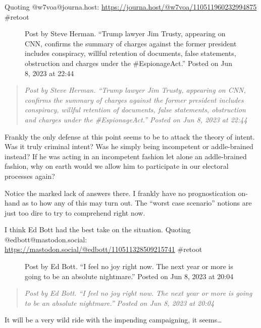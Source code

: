 Quoting @w7voa@journa.host:
\url{https://journa.host/@w7voa/110511960232994875} \#retoot

\begin{figure}
\centering
{}
\caption{Post by Steve Herman. ``Trump lawyer Jim Trusty, appearing on
CNN, confirms the summary of charges against the former president
includes conspiracy, willful retention of documents, false statements,
obstruction and charges under the \#EspionageAct.'' Posted on Jun 8,
2023 at 22:44}
\end{figure}

\begin{quote}
\emph{Post by Steve Herman. ``Trump lawyer Jim Trusty, appearing on CNN,
confirms the summary of charges against the former president includes
conspiracy, willful retention of documents, false statements,
obstruction and charges under the \#EspionageAct.'' Posted on Jun 8,
2023 at 22:44}
\end{quote}

Frankly the only defense at this point seems to be to attack the theory
of intent. Was it truly criminal intent? Was he simply being incompetent
or addle-brained instead? If he was acting in an incompetent fashion let
alone an addle-brained fashion, why on earth would we allow him to
participate in our electoral processes again?

Notice the marked lack of answers there. I frankly have no
prognostication on-hand as to how any of this may turn out. The ``worst
case scenario'' notions are just too dire to try to comprehend right
now.

I think Ed Bott had the best take on the situation. Quoting
@edbott@mastodon.social:
\url{https://mastodon.social/@edbott/110511328509215741} \#retoot

\begin{figure}
\centering
{}
\caption{Post by Ed Bott. ``I feel no joy right now. The next year or
more is going to be an absolute nightmare.'' Posted on Jun 8, 2023 at
20:04}
\end{figure}

\begin{quote}
\emph{Post by Ed Bott. ``I feel no joy right now. The next year or more
is going to be an absolute nightmare.'' Posted on Jun 8, 2023 at 20:04}
\end{quote}

It will be a very wild ride with the impending campaigning, it
seems\ldots{}
